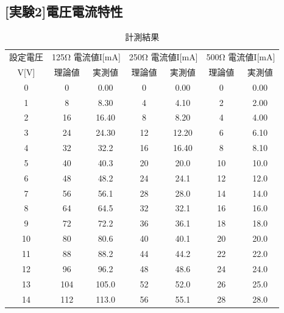 \documentclass[titlepage]{jarticle}
\begin{document}
\subsection{[実験2]電圧電流特性}
\begin{table}[H]
    \centering
    \label{tab:tab`le1}
    \caption{計測結果}
    \begin{tabular}{c|c|c|c|c|c|c|c} \hline \hline
        \multicolumn{2}{c|}{設定電圧} & \multicolumn{2}{c|}{125Ω 電流値I[mA]} 
        & \multicolumn{2}{c|}{250Ω 電流値I[mA]} & \multicolumn{2}{c}{500Ω 電流値I[mA]}\\\cline{3-8}
        \multicolumn{2}{c|}{V[V]} & 理論値 & 実測値 & 理論値 & 実測値 & 理論値 & 実測値\\
    \hline
        \multicolumn{2}{c|}{0} & 0 & 0.00 & 0 & 0.00 & 0 & 0.00 \\\hline
        \multicolumn{2}{c|}{1} & 8 & 8.30 & 4 & 4.10 & 2 & 2.00 \\\hline
        \multicolumn{2}{c|}{2} & 16 & 16.40 & 8 & 8.20 & 4 & 4.00 \\ \hline
        \multicolumn{2}{c|}{3} & 24 & 24.30 & 12 & 12.20 & 6 & 6.10 \\ \hline
        \multicolumn{2}{c|}{4} & 32 & 32.2 & 16 & 16.40 & 8 & 8.10 \\ \hline
        \multicolumn{2}{c|}{5} & 40 & 40.3 & 20 & 20.0 & 10 & 10.0 \\ \hline
        \multicolumn{2}{c|}{6} & 48 & 48.2 & 24 & 24.1 & 12 & 12.0 \\ \hline
        \multicolumn{2}{c|}{7} & 56 & 56.1 & 28 & 28.0 & 14 & 14.0 \\ \hline
        \multicolumn{2}{c|}{8} & 64 & 64.5 & 32 & 32.1 & 16 & 16.0 \\ \hline
        \multicolumn{2}{c|}{9} & 72 & 72.2 & 36 & 36.1 & 18 & 18.0 \\ \hline
        \multicolumn{2}{c|}{10} & 80 & 80.6 & 40 & 40.1 & 20 & 20.0 \\ \hline
        \multicolumn{2}{c|}{11} & 88 & 88.2 & 44 & 44.2 & 22 & 22.0 \\ \hline
        \multicolumn{2}{c|}{12} & 96 & 96.2 & 48 & 48.6 & 24 & 24.0 \\ \hline
        \multicolumn{2}{c|}{13} & 104 & 105.0 & 52 & 52.0 & 26 & 25.0 \\ \hline
        \multicolumn{2}{c|}{14} & 112 & 113.0 & 56 & 55.1 & 28 & 28.0 \\ \hline
      \end{tabular}
\end{table}
\end{document}
